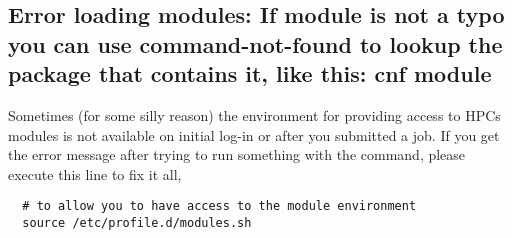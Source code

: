\subsection{Error loading modules: If module is not a typo you can use command-not-found to lookup the package that contains it, like this: cnf module}
%
%
Sometimes (for some silly reason) the environment for providing access to HPCs modules is not available on initial log-in or after you submitted a job. If you get the error message  after trying to run something with the  command, please execute this line to fix it all,
%
%
\begin{verbatim}
  # to allow you to have access to the module environment
  source /etc/profile.d/modules.sh
\end{verbatim}
%
%
%
